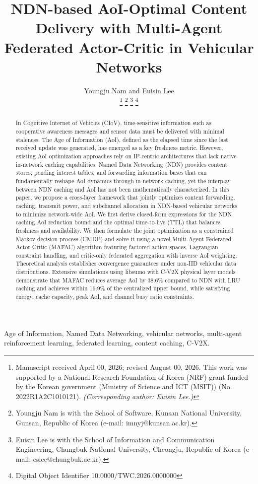 \documentclass[journal]{IEEEtran}
\title{NDN-based AoI-Optimal Content Delivery with Multi-Agent Federated Actor-Critic in Vehicular Networks}
\author{Youngju Nam and Euisin Lee

\thanks{Manuscript received April 00, 2026; revised August 00, 2026.
This work was supported by a National Research Foundation of Korea (NRF) grant funded by the Korean government (Ministry of Science and ICT (MSIT)) (No. 2022R1A2C1010121). \textit{(Corresponding author: Euisin Lee.)}}
\thanks{Youngju Nam is with the School of Software, Kunsan National University, Gunsan, Republic of Korea (e-mail: imnyj@kunsan.ac.kr).}
\thanks{Euisin Lee is with the School of Information and Communication Engineering, Chungbuk National University, Cheongju, Republic of Korea (e-mail: eslee@chungbuk.ac.kr).}
\thanks{Digital Object Identifier 10.0000/TWC.2026.0000000}}
\begin{document}
\maketitle

\begin{abstract}
In Cognitive Internet of Vehicles (CIoV), time-sensitive information such as cooperative awareness messages and sensor data must be delivered with minimal staleness. The Age of Information (AoI), defined as the elapsed time since the last received update was generated, has emerged as a key freshness metric. However, existing AoI optimization approaches rely on IP-centric architectures that lack native in-network caching capabilities. Named Data Networking (NDN) provides content stores, pending interest tables, and forwarding information bases that can fundamentally reshape AoI dynamics through in-network caching, yet the interplay between NDN caching and AoI has not been mathematically characterized. In this paper, we propose a cross-layer framework that jointly optimizes content forwarding, caching, transmit power, and subchannel allocation in NDN-based vehicular networks to minimize network-wide AoI. We first derive closed-form expressions for the NDN caching AoI reduction bound and the optimal time-to-live (TTL) that balances freshness and availability. We then formulate the joint optimization as a constrained Markov decision process (CMDP) and solve it using a novel Multi-Agent Federated Actor-Critic (MAFAC) algorithm featuring factored action spaces, Lagrangian constraint handling, and critic-only federated aggregation with inverse AoI weighting. Theoretical analysis establishes convergence guarantees under non-IID vehicular data distributions. Extensive simulations using libsumo with C-V2X physical layer models demonstrate that MAFAC reduces average AoI by 38.6\% compared to NDN with LRU caching and achieves within 16.9\% of the centralized upper bound, while satisfying energy, cache capacity, peak AoI, and channel busy ratio constraints.
\end{abstract}

\begin{IEEEkeywords}
Age of Information, Named Data Networking, vehicular networks, multi-agent reinforcement learning, federated learning, content caching, C-V2X.
\end{IEEEkeywords}

\end{document}
